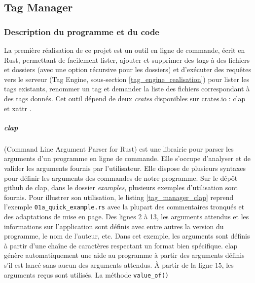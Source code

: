 \subsection{Tag Manager}\label{tag_manager}
\subsubsection{Description du programme et du code}\label{tag_manager_description}
La première réalisation de ce projet est un outil en ligne de commande, écrit en Rust, permettant 
de facilement lister, ajouter et supprimer des tags à des fichiers et dossiers (avec une option 
récursive pour les dossiers) et d'exécuter des requêtes vers le serveur (Tag Engine, sous-section 
\ref{tag_engine_realisation}) pour lister 
les tags existants, renommer un tag et demander la liste des fichiers correspondant à des tags 
donnés. Cet outil dépend de deux \textit{crates} disponibles sur \href{https://crates.io}{crates.io} 
: clap \cite{ref22} et xattr \cite{ref23}.
\subparagraph{clap}
(Command Line Argument Parser for Rust) est une 
librairie pour parser les arguments d'un programme en ligne de commande. Elle s'occupe d'analyser 
et de valider les arguments fournis par l'utilisateur. Elle dispose de plusieurs syntaxes pour 
définir les arguments des commandes de notre programme. Sur le dépôt github de clap, dans le 
dossier \textit{examples}, plusieurs exemples d'utilisation sont fournis. Pour illustrer son 
utilisation, le listing \ref{tag_manager_clap} reprend l'exemple \texttt{01a_quick_example.rs} 
avec la plupart des commentaires tronqués et des adaptations de mise en page. Des lignes 2 à 13, 
les arguments attendus et les informations sur l'application sont définis avec entre autres la 
version du programme, le nom de l'auteur, etc. Dans cet exemple, les arguments sont définis à 
partir d'une chaîne de caractères respectant un format bien spécifique. clap génère automatiquement 
une aide au programme à partir des arguments définis s'il est lancé sans aucun des arguments attendus.
À partir de la ligne 15, les arguments reçus sont utilisés. La méthode \texttt{value_of()} 
